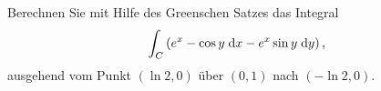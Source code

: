 \begin{atiTask}[
  title = Kurvenintegral mit Greenschen Satz
]
Berechnen Sie mit Hilfe des Greenschen Satzes das Integral
\[
\int_C \left(e^x-\cos y\;\mathrm{d} x - e^x\sin y\;\mathrm{d} y\right),
\]
ausgehend vom Punkt $(\ln 2, 0)$ über $(0,1)$ nach $(-\ln 2,0)$.
\end{atiTask}
